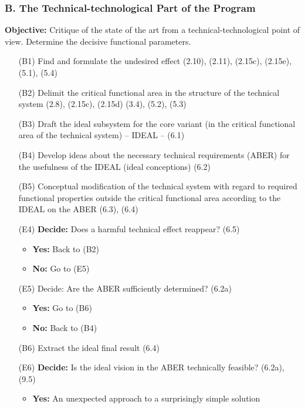 \documentclass[12pt,a4paper]{article}
\begin{document}
\subsubsection*{B. The Technical-technological Part of the Program}
        
\textbf{Objective:} Critique of the state of the art from a
technical-technological point of view. Determine the decisive functional
parameters.

\begin{itemize}[leftmargin=35pt,align=left]
\item[(B1)] Find and formulate the undesired effect (2.10), (2.11), (2.15c),
  (2.15e), (5.1), (5.4)
\item[(B2)] Delimit the critical functional area in the structure of the
  technical system (2.8), (2.15c), (2.15d) (3.4), (5.2), (5.3)
\item[(B3)] Draft the ideal subsystem for the core variant (in the critical
  functional area of the technical system) – IDEAL – (6.1)
\item[(B4)] Develop ideas about the necessary technical requirements (ABER)
  for the usefulness of the IDEAL (ideal conceptions) (6.2)
\item[(B5)] Conceptual modification of the technical system with regard to
  required functional properties outside the critical functional area
  according to the IDEAL on the ABER (6.3), (6.4)
\item[(E4)] \textbf{Decide:} Does a harmful technical effect reappear? (6.5)
  \begin{itemize}[leftmargin=20pt]
  \item \textbf{Yes:} Back to (B2)
  \item \textbf{No:} Go to (E5)
  \end{itemize}
\item[(E5)] Decide: Are the ABER sufficiently determined? (6.2a)
  \begin{itemize}[leftmargin=20pt]
  \item \textbf{Yes:} Go to (B6)
  \item \textbf{No:} Back to (B4)
  \end{itemize}
\item[(B6)] Extract the ideal final result (6.4)
\item[(E6)] \textbf{Decide:} Is the ideal vision in the ABER technically
  feasible? (6.2a), (9.5)
  \begin{itemize}[leftmargin=20pt]
  \item \textbf{Yes:} An unexpected approach to a surprisingly simple solution

\end{itemize}
\end{itemize}
\end{document}
